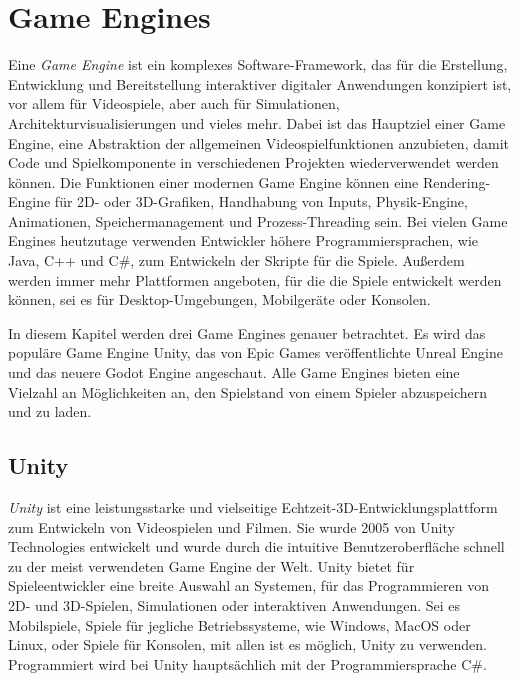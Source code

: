 \chapter{Game Engines}\label{ch:gameengines}
Eine \textit{Game Engine} ist ein komplexes Software-Framework, das für die Erstellung, Entwicklung und Bereitstellung interaktiver digitaler Anwendungen konzipiert ist, vor allem für Videospiele, aber auch für Simulationen, Architekturvisualisierungen und vieles mehr. Dabei ist das Hauptziel einer Game Engine, eine Abstraktion der allgemeinen Videospielfunktionen anzubieten, damit Code und Spielkomponente in verschiedenen Projekten wiederverwendet werden können. Die Funktionen einer modernen Game Engine können eine Rendering-Engine für 2D- oder 3D-Grafiken, Handhabung von Inputs, Physik-Engine, Animationen, Speichermanagement und Prozess-Threading sein. Bei vielen Game Engines heutzutage verwenden Entwickler höhere Programmiersprachen, wie Java, C++ und C\#, zum Entwickeln der Skripte für die Spiele. Außerdem werden immer mehr Plattformen angeboten, für die die Spiele entwickelt werden können, sei es für Desktop-Umgebungen, Mobilgeräte oder Konsolen.\cite{andrade2015game}

In diesem Kapitel werden drei Game Engines genauer betrachtet. Es wird das populäre Game Engine Unity, das von Epic Games veröffentlichte Unreal Engine und das neuere Godot Engine angeschaut. Alle Game Engines bieten eine Vielzahl an Möglichkeiten an, den Spielstand von einem Spieler abzuspeichern und zu laden.


\section{Unity}
\textit{Unity} ist eine leistungsstarke und vielseitige Echtzeit-3D-Entwicklungsplattform zum Entwickeln von Videospielen und Filmen. Sie wurde 2005 von Unity Technologies entwickelt und wurde durch die intuitive Benutzeroberfläche schnell zu der meist verwendeten Game Engine der Welt. Unity bietet für Spieleentwickler eine breite Auswahl an Systemen, für das Programmieren von 2D- und 3D-Spielen, Simulationen oder interaktiven Anwendungen. Sei es Mobilspiele, Spiele für jegliche Betriebssysteme, wie Windows, MacOS oder Linux, oder Spiele für Konsolen, mit allen ist es möglich, Unity zu verwenden. Programmiert wird bei Unity hauptsächlich mit der Programmiersprache C\#.\cite{unityUnityEngine}\cite{vsmid2017comparison}


